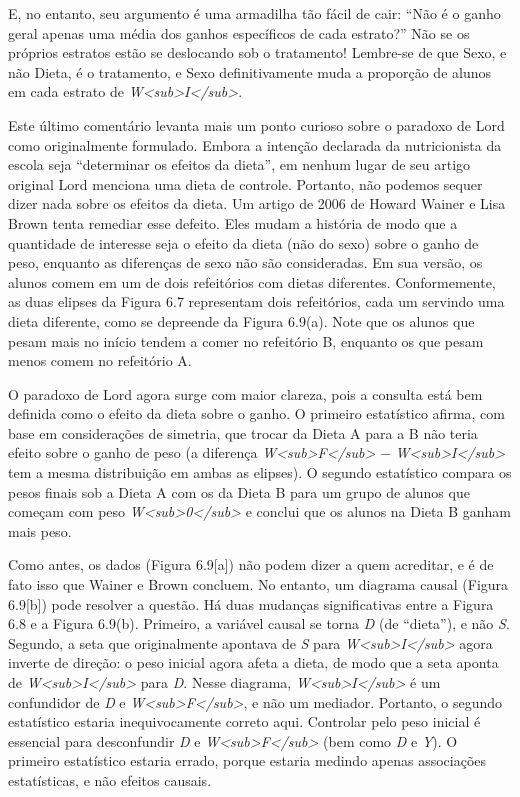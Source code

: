 \documentclass[11pt,a5paper,twoside]{book}
\begin{document}
E, no entanto, seu argumento é uma armadilha tão fácil de cair: “Não é o ganho geral apenas uma média dos ganhos específicos de cada estrato?” Não se os próprios estratos estão se deslocando sob o tratamento! Lembre-se de que Sexo, e não Dieta, é o tratamento, e Sexo definitivamente muda a proporção de alunos em cada estrato de \textit{W<sub>I</sub>}.

Este último comentário levanta mais um ponto curioso sobre o paradoxo de Lord como originalmente formulado. Embora a intenção declarada da nutricionista da escola seja “determinar os efeitos da dieta”, em nenhum lugar de seu artigo original Lord menciona uma dieta de controle. Portanto, não podemos sequer dizer nada sobre os efeitos da dieta. Um artigo de 2006 de Howard Wainer e Lisa Brown tenta remediar esse defeito. Eles mudam a história de modo que a quantidade de interesse seja o efeito da dieta (não do sexo) sobre o ganho de peso, enquanto as diferenças de sexo não são consideradas. Em sua versão, os alunos comem em um de dois refeitórios com dietas diferentes. Conformemente, as duas elipses da Figura 6.7 representam dois refeitórios, cada um servindo uma dieta diferente, como se depreende da Figura 6.9(a). Note que os alunos que pesam mais no início tendem a comer no refeitório B, enquanto os que pesam menos comem no refeitório A.

O paradoxo de Lord agora surge com maior clareza, pois a consulta está bem definida como o efeito da dieta sobre o ganho. O primeiro estatístico afirma, com base em considerações de simetria, que trocar da Dieta A para a B não teria efeito sobre o ganho de peso (a diferença \textit{W<sub>F</sub>} − \textit{W<sub>I</sub>} tem a mesma distribuição em ambas as elipses). O segundo estatístico compara os pesos finais sob a Dieta A com os da Dieta B para um grupo de alunos que começam com peso \textit{W<sub>0</sub>} e conclui que os alunos na Dieta B ganham mais peso.

Como antes, os dados (Figura 6.9[a]) não podem dizer a quem acreditar, e é de fato isso que Wainer e Brown concluem. No entanto, um diagrama causal (Figura 6.9[b]) pode resolver a questão. Há duas mudanças significativas entre a Figura 6.8 e a Figura 6.9(b). Primeiro, a variável causal se torna \textit{D} (de “dieta”), e não \textit{S}. Segundo, a seta que originalmente apontava de \textit{S} para \textit{W<sub>I</sub>} agora inverte de direção: o peso inicial agora afeta a dieta, de modo que a seta aponta de \textit{W<sub>I</sub>} para \textit{D}. Nesse diagrama, \textit{W<sub>I</sub>} é um confundidor de \textit{D} e \textit{W<sub>F</sub>}, e não um mediador. Portanto, o segundo estatístico estaria inequivocamente correto aqui. Controlar pelo peso inicial é essencial para desconfundir \textit{D} e \textit{W<sub>F</sub>} (bem como \textit{D} e \textit{Y}). O primeiro estatístico estaria errado, porque estaria medindo apenas associações estatísticas, e não efeitos causais.
\end{document}
